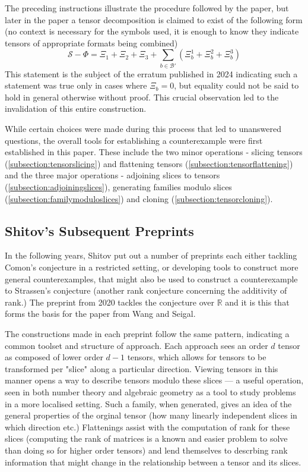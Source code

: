 \documentclass[12pt,a4paper,oneside]{book}
\def\reals{\mathbb{R}} %
\theoremstyle{definition}
\begin{document}
The preceding instructions illustrate the procedure followed by the paper, but later in the paper a tensor decomposition is claimed to exist of the following form (no context is necessary for the symbols used, it is enough to know they indicate tensors of appropriate formats being combined)
 $$\mathcal{S} - \Phi = \Xi_1 + \Xi_2 + \Xi_3 + \sum_{b \in \mathcal{B}'} (\Xi_b^1 + \Xi_b^2 + \Xi_b^3)$$ This statement is the subject of the erratum published in 2024 \cite{draisma_erratum_2024} indicating such a statement was true only in cases where $\Xi_b = 0$, but equality could not be said to hold in general otherwise without proof. This crucial observation led to the invalidation of this entire construction.

 While certain choices were made during this process that led to unanswered questions, the overall tools for establishing a counterexample were first established in this paper. These include the two minor operations - slicing tensors (\cref{subsection:tensorslicing}) and flattening tensors (\cref{subsection:tensorflattening}) and the three major operations - adjoining slices to tensors (\cref{subsection:adjoiningslices}), generating families modulo slices (\cref{subsection:familymoduloslices}) and cloning (\cref{subsection:tensorcloning}).  
\subsection{Shitov's Subsequent Preprints}\label{section:shitovpreprints}

In the following years, Shitov put out a number of preprints \cite{shitov_comons_2020,shitov_higher_2024,shitov_higher_2024-1} each either tackling Comon's conjecture in a restricted setting, or developing tools to construct more general counterexamples, that might also be used to construct a counterexample to Strassen's conjecture (another rank conjecture concerning the additivity of rank.) The preprint from 2020 \cite{shitov_comons_2020} tackles the conjecture over $\reals$ and it is this that forms the basis for the paper from Wang and Seigal\cite{wang_lower_2023}.

The constructions made in each preprint follow the same pattern, indicating a common toolset and structure of approach. Each approach sees an order $d$ tensor as composed of lower order $d-1$ tensors, which allows for tensors to be transformed per "slice" along a particular direction. Viewing tensors in this manner opens a way to describe tensors modulo these slices --- a useful operation, seen in both number theory and algebraic geometry as a tool to study problems in a more localised setting. Such a family, when generated, gives an idea of the general properties of the orginal tensor (how many linearly independent slices in which direction etc.) Flattenings assist with the computation of rank for these slices (computing the rank of matrices is a known and easier problem to solve than doing so for higher order tensors) and lend themselves to descrbing rank information that might change in the relationship between a tensor and its slices.
\end{document}
